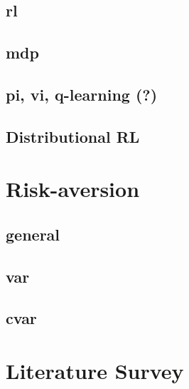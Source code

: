 \subsection{rl}

\subsection{mdp}

\subsection{pi, vi, q-learning (?)}

\subsection{Distributional RL}



\section{Risk-aversion}

\subsection{general}

\subsection{var}

\subsection{cvar}


\section{Literature Survey}


